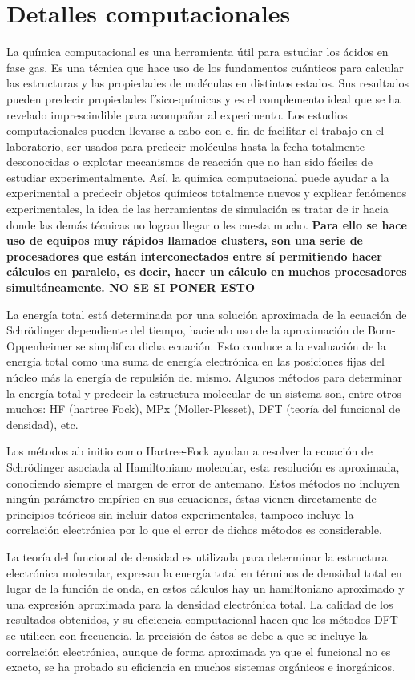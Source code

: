 \chapter{Detalles computacionales}

La química computacional es una herramienta útil para estudiar los ácidos en fase gas. Es una técnica que hace uso de los fundamentos cuánticos para calcular las estructuras y las propiedades de moléculas en distintos estados. Sus resultados pueden predecir propiedades físico-químicas y es el complemento ideal que se ha revelado imprescindible para acompañar al experimento. Los estudios computacionales pueden llevarse a cabo con el fin de facilitar el trabajo en el laboratorio, ser usados para predecir moléculas hasta la fecha totalmente desconocidas o explotar mecanismos de reacción que no han sido fáciles de estudiar experimentalmente. Así, la química computacional puede ayudar a la experimental a predecir objetos químicos totalmente nuevos y explicar fenómenos experimentales, la idea de las herramientas de simulación es tratar de ir hacia donde las demás técnicas no logran llegar o les cuesta mucho. {\bfseries Para ello se hace uso de equipos muy rápidos llamados clusters, son una serie de procesadores que están interconectados entre sí permitiendo hacer cálculos en paralelo, es decir, hacer un cálculo en muchos procesadores simultáneamente. NO SE SI PONER ESTO}

La energía total está determinada por una solución aproximada de la ecuación de Schrödinger dependiente del tiempo, haciendo uso de la aproximación de Born-Oppenheimer se simplifica dicha ecuación. Esto conduce a la evaluación de la energía total como una suma de energía electrónica en las posiciones fijas del núcleo más la energía de repulsión del mismo. Algunos métodos para determinar la energía total y predecir la estructura molecular de un sistema son, entre otros muchos: HF (hartree Fock), MPx (Moller-Plesset), DFT (teoría del funcional de densidad), etc. \cite {quimica2}

Los métodos ab initio como Hartree-Fock ayudan a resolver la ecuación de Schrödinger asociada al Hamiltoniano molecular, esta resolución es aproximada, conociendo siempre el margen de error de antemano. Estos métodos no incluyen ningún parámetro empírico en sus ecuaciones, éstas vienen directamente de principios teóricos sin incluir datos experimentales, tampoco incluye la correlación electrónica por lo que el error de dichos métodos es considerable.

La teoría del funcional de densidad es utilizada para determinar la estructura electrónica molecular, expresan la energía total en términos de densidad total en lugar de la función de onda, en estos cálculos hay un hamiltoniano aproximado y una expresión aproximada para la densidad electrónica total. La calidad de los resultados obtenidos, y su eficiencia computacional hacen que los métodos DFT se utilicen con frecuencia, la precisión de éstos se debe a que se incluye la correlación electrónica, aunque de forma aproximada ya que el funcional no es exacto, se ha probado su eficiencia en muchos sistemas orgánicos e inorgánicos.

